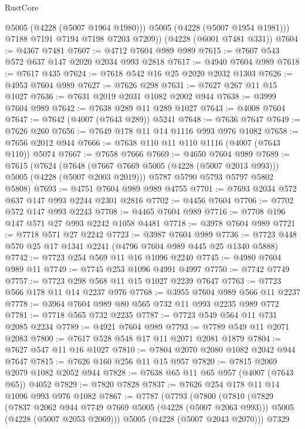 \begin{lexlean}{RustCore}
\begin{coremodule}
            @5005
            (@4228 (@5007 @1964 @1980)))
          @5005
          (@4228 (@5007 @1954 @1981)))
        @7188
        @7191
        @7194
        @7198
        @7203
        @7209))
    (@4228 (@6001 @7481 @331))
@7604 := @4367 @7481
@7607 := @4712 @7604 @989 @989
@7615 := @7607 @543 @572 @637 @147 @2020 @2034 @993 @2818
@7617 := @4940 @7604 @989
@7618 := @7617 @435
@7624 := @7618 @542 @16 @25 @2020 @2032 @1303
@7626 := @4953 @7604 @989
@7627 := @7626 @298
@7631 := @7627 @267 @11 @15 @1027
@7636 := @7631 @2019 @2031 @1082 @2002 @944
@7638 := @3999 @7604 @989
@7642 := @7638 @289 @11 @289 @1027
@7643 := @4008 @7604
@7647 := @7642 (@4007 (@7643 @289)) @5241
@7648 := @7636 @7647
@7649 := @7626 @260
@7656 := @7649 @178 @11 @14 @1116 @993 @976 @1082
@7658 := @7656 @2012 @944
@7666 := @7638 @110 @11 @110 @1116 (@4007 (@7643 @110)) @5074
@7667 := @7658 @7666
@7669 := @4650 @7604 @989
@7689 := @7615
    (@7624
      (@7648 (@7667 @7669 @5005 (@4228 (@5007 @2013 @993))) @5005 (@4228 (@5007 @2003 @2019)))
      @5787
      @5790
      @5793
      @5797
      @5802
      @5808)
@7693 := @4751 @7604 @989 @989 @4755
@7701 := @7693 @2034 @572 @637 @147 @993 @2244 @2301 @2816
@7702 := @4456 @7604
@7706 := @7702 @572 @147 @993 @2243
@7708 := @4465 @7604 @989
@7716 := @7708 @196 @147 @571 @27 @993 @2242 @1058 @4481
@7718 := @3978 @7604 @989
@7721 := @7718 @571 @27 @2242
@7723 := @3987 @7604 @989
@7736 := @7723 @448 @570 @25 @17 @1341 @2241 (@4796 @7604 @989 @445 @25 @1340 @5888)
@7742 := @7723 @254 @569 @11 @16 @1096 @2240
@7745 := @4980 @7604 @989 @11
@7749 := @7745 @253 @1096 @4991 @4997
@7750 := @7742 @7749
@7757 := @7723 @298 @568 @11 @15 @1027 @2239 @7647
@7763 := @7723 @566 @178 @11 @14 @2237 @976
@7768 := @3955 @7604 @989 @566 @11 @2237
@7778 := @3964 @7604 @989 @80 @565 @732 @11 @993 @2235 @989 @772
@7781 := @7718 @565 @732 @2235
@7787 := @7723 @549 @564 @11 @731 @2085 @2234
@7789 := @4921 @7604 @989
@7793 := @7789 @549 @11 @2071 @2083
@7800 := @7617 @528 @548 @17 @11 @2071 @2081 @1879
@7804 := @7627 @547 @11 @16 @1027
@7810 := @7804 @2070 @2080 @1082 @2042 @944 @7647
@7815 := @7626 @160 @256 @11 @15 @957
@7820 := @7815 @2069 @2079 @1082 @2052 @944
@7828 := @7638 @65 @11 @65 @957 (@4007 (@7643 @65)) @4052
@7829 := @7820 @7828
@7837 := @7626 @254 @178 @11 @14 @1096 @993 @976 @1082
@7867 := @7787
    (@7793
      (@7800
        (@7810
          (@7829
            (@7837 @2062 @944 @7749 @7669 @5005 (@4228 (@5007 @2063 @993)))
            @5005
            (@4228 (@5007 @2053 @2069)))
          @5005
          (@4228 (@5007 @2043 @2070)))
        @7329

\end{coremodule}
\end{lexlean}
